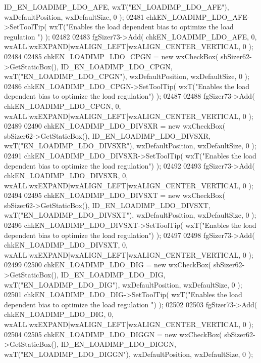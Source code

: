 \begin{DoxyCode}
      ID_EN_LOADIMP_LDO_AFE, wxT(\textcolor{stringliteral}{"EN\_LOADIMP\_LDO\_AFE"}), wxDefaultPosition, wxDefaultSize, 0 );
02481     chkEN_LOADIMP_LDO_AFE->SetToolTip( wxT(\textcolor{stringliteral}{"Enables the load dependent bias to optimize the load regulation
      "}) );
02482     
02483     fgSizer73->Add( chkEN_LOADIMP_LDO_AFE, 0, wxALL|wxEXPAND|wxALIGN\_LEFT|wxALIGN\_CENTER\_VERTICAL, 0 );
02484     
02485     chkEN_LOADIMP_LDO_CPGN = \textcolor{keyword}{new} wxCheckBox( sbSizer62->GetStaticBox(), 
      ID_EN_LOADIMP_LDO_CPGN, wxT(\textcolor{stringliteral}{"EN\_LOADIMP\_LDO\_CPGN"}), wxDefaultPosition, wxDefaultSize, 0 );
02486     chkEN_LOADIMP_LDO_CPGN->SetToolTip( wxT(\textcolor{stringliteral}{"Enables the load dependent bias to optimize the load
       regulation"}) );
02487     
02488     fgSizer73->Add( chkEN_LOADIMP_LDO_CPGN, 0, wxALL|wxEXPAND|wxALIGN\_LEFT|wxALIGN\_CENTER\_VERTICAL, 0 );
02489     
02490     chkEN_LOADIMP_LDO_DIVSXR = \textcolor{keyword}{new} wxCheckBox( sbSizer62->GetStaticBox(), 
      ID_EN_LOADIMP_LDO_DIVSXR, wxT(\textcolor{stringliteral}{"EN\_LOADIMP\_LDO\_DIVSXR"}), wxDefaultPosition, wxDefaultSize, 0 );
02491     chkEN_LOADIMP_LDO_DIVSXR->SetToolTip( wxT(\textcolor{stringliteral}{"Enables the load dependent bias to optimize the load
       regulation"}) );
02492     
02493     fgSizer73->Add( chkEN_LOADIMP_LDO_DIVSXR, 0, wxALL|wxEXPAND|wxALIGN\_LEFT|wxALIGN\_CENTER\_VERTICAL, 0 );
02494     
02495     chkEN_LOADIMP_LDO_DIVSXT = \textcolor{keyword}{new} wxCheckBox( sbSizer62->GetStaticBox(), 
      ID_EN_LOADIMP_LDO_DIVSXT, wxT(\textcolor{stringliteral}{"EN\_LOADIMP\_LDO\_DIVSXT"}), wxDefaultPosition, wxDefaultSize, 0 );
02496     chkEN_LOADIMP_LDO_DIVSXT->SetToolTip( wxT(\textcolor{stringliteral}{"Enables the load dependent bias to optimize the load
       regulation"}) );
02497     
02498     fgSizer73->Add( chkEN_LOADIMP_LDO_DIVSXT, 0, wxALL|wxEXPAND|wxALIGN\_LEFT|wxALIGN\_CENTER\_VERTICAL, 0 );
02499     
02500     chkEN_LOADIMP_LDO_DIG = \textcolor{keyword}{new} wxCheckBox( sbSizer62->GetStaticBox(), 
      ID_EN_LOADIMP_LDO_DIG, wxT(\textcolor{stringliteral}{"EN\_LOADIMP\_LDO\_DIG"}), wxDefaultPosition, wxDefaultSize, 0 );
02501     chkEN_LOADIMP_LDO_DIG->SetToolTip( wxT(\textcolor{stringliteral}{"Enables the load dependent bias to optimize the load regulation
      "}) );
02502     
02503     fgSizer73->Add( chkEN_LOADIMP_LDO_DIG, 0, wxALL|wxEXPAND|wxALIGN\_LEFT|wxALIGN\_CENTER\_VERTICAL, 0 );
02504     
02505     chkEN_LOADIMP_LDO_DIGGN = \textcolor{keyword}{new} wxCheckBox( sbSizer62->GetStaticBox(), 
      ID_EN_LOADIMP_LDO_DIGGN, wxT(\textcolor{stringliteral}{"EN\_LOADIMP\_LDO\_DIGGN"}), wxDefaultPosition, wxDefaultSize, 0 );

\end{DoxyCode}
